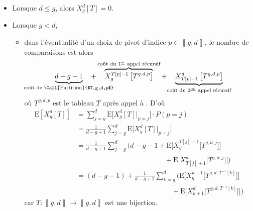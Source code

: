 \begin{prv}
	\begin{itemize}
		\item Lorsque $d \le g$, alors $X_g^d[T] = 0$.
		\item Lorsque $g < d$,
			\begin{itemize}
				\item dans l'éventualité d'un choix de pivot d'indice $p \in \left\llbracket g,d \right\rrbracket$, le nombre de comparaisons est alors \[
						\underbrace{d - g - 1}_{\mathclap{\text{coût de \Call{Partition}{$T,g,d,p$}}}}\quad+\quad \overbrace{X_g^{T[p] - 1}\left[ T^{g,d,p} \right]}^{\text{\clap{coût du 1\tsup{er} appel récursif}}}\quad+\quad \underbrace{X_{T[p] + 1}^d\left[ T^{g,d,p} \right]}_{\text{\clap{coût du 2\tsup{nd} appel récursif}}}
					\] où $T^{g,d,p}$\/ est le tableau $T$\/ après appel à . D'où
					\begin{align*}
						\mathrm{E}\left[ X^d_g[T] \right] &= \sum_{j=g}^d \mathrm{E}\Big[X^d_g[T]\Big|_{p=j}\Big] \cdot P(p = j)\\
						&= \frac{1}{d - g + 1} \sum_{j=g}^d \mathrm{E}\Big[X^d_g[T]\Big|_{p=j}\Big] \\
						&= \frac{1}{d - g + 1} \sum_{j=g}^d \bigg(d-g-1 + \mathrm{E}\Big[X^{T[j] - 1}_g \big[T^{g,d,j}\big]\Big] \\
						&\phantom{=}\:\qquad\qquad\qquad\qquad\qquad\quad+ \mathrm{E}\Big[X_{T[j] + 1}^d \Big[T^{g,d,j}\big]\Big]\bigg) \\
						&=  (d-g-1) + \frac{1}{d - g + 1} \sum_{k=g}^d \bigg(\mathrm{E}\Big[X^{k - 1}_g \Big[T^{g,d,T^{-1}[k]}\Big]\Big]\\
						&\phantom{=}\:\qquad\qquad\qquad\qquad\qquad\!\qquad+\mathrm{E}\Big[X_{k + 1}^d \Big[T^{g,d,T^{-1}[k]}\Big]\Big]\bigg)
					\end{align*}
					car $T : \left\llbracket g,d \right\rrbracket \to \left\llbracket g,d \right\rrbracket$\/ est une bijection.


\end{itemize}
\end{itemize}
\end{prv}

